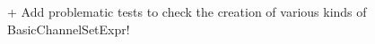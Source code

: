 \documentclass{article}
\begin{document}
%
%
%
%
%
%
%

%

+ Add problematic tests to check the creation of various kinds of BasicChannelSetExpr!
\end{document}
